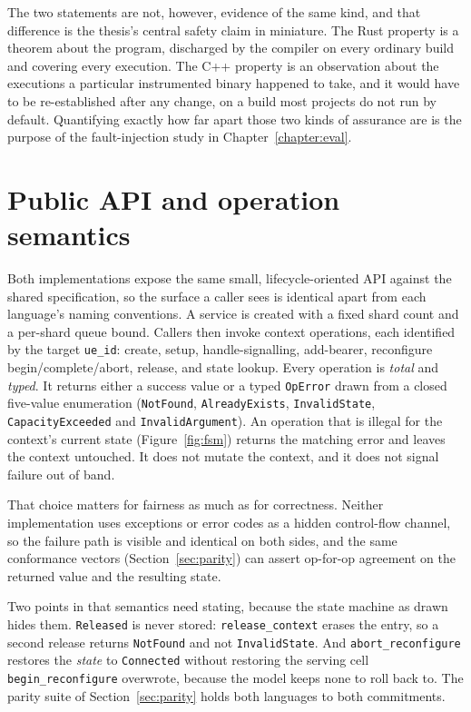 \documentclass[english,oneside,a4paper,censored,csm,software-track-2020]{HYthesisML}
\begin{document}
The two statements are not, however, evidence of the same kind, and that difference is the
thesis's central safety claim in miniature. The Rust property is a theorem about the program,
discharged by the compiler on every ordinary build and covering every execution. The C++
property is an observation about the executions a particular instrumented binary happened to
take, and it would have to be re-established after any change, on a build most projects do not
run by default. Quantifying exactly how far apart those two kinds of assurance are is the
purpose of the fault-injection study in Chapter~\ref{chapter:eval}.

\section{Public API and operation semantics}
Both implementations expose the same small, lifecycle-oriented API against the shared
specification, so the surface a caller sees is identical apart from each language's naming
conventions. A service is created with a fixed shard count and a per-shard queue bound.
Callers then invoke context operations, each identified by the target \texttt{ue\_id}: create,
setup, handle-signalling, add-bearer, reconfigure begin/complete/abort, release, and state
lookup. Every operation is \emph{total} and \emph{typed}. It returns either a success value or
a typed \texttt{OpError} drawn from a closed five-value enumeration (\texttt{NotFound},
\texttt{AlreadyExists}, \texttt{InvalidState}, \texttt{CapacityExceeded} and
\texttt{InvalidArgument}). An operation that is illegal for the context's
current state (Figure~\ref{fig:fsm}) returns the matching error and leaves the context
untouched. It does not mutate the context, and it does not signal failure out of band.

That choice matters for fairness as much as for correctness. Neither implementation uses
exceptions or error codes as a hidden control-flow channel, so the failure path is visible and
identical on both sides, and the same conformance vectors (Section~\ref{sec:parity}) can assert
op-for-op agreement on the returned value and the resulting state.

Two points in that semantics need stating, because the state machine as drawn hides them.
\texttt{Released} is never stored: \texttt{release\_context} erases the entry, so a second
release returns \texttt{NotFound} and not \texttt{InvalidState}. And
\texttt{abort\_reconfigure} restores the \emph{state} to \texttt{Connected} without restoring the
serving cell \texttt{begin\_reconfigure} overwrote, because the model keeps none to roll back to.
The parity suite of Section~\ref{sec:parity} holds both languages to both commitments.
\end{document}
